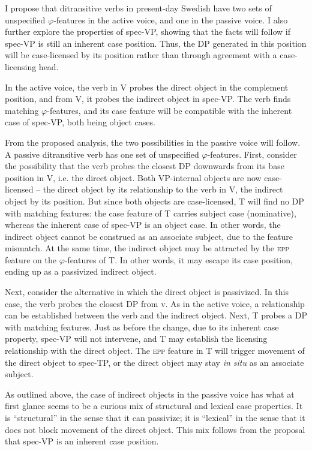 \documentclass[output=paper]{langscibook}
\begin{document}
I propose that ditransitive verbs in present-day Swedish have two sets of unspecified $\varphi $-features in the active voice, and one in the passive voice. I also further explore the properties of spec-VP, showing that the facts will follow if spec-VP is still an inherent case position. Thus, the DP generated in this position will be case-licensed by its position rather than through agreement with a case-licensing head.



In the active voice, the verb in V probes the direct object in the complement position, and from V, it probes the indirect object in spec-VP. The verb finds matching $\varphi $-features, and its case feature will be compatible with the inherent case of spec-VP, both being object cases.



From the proposed analysis, the two possibilities in the passive voice will follow. A passive ditransitive verb has one set of unspecified $\varphi $-features. First, consider the possibility that the verb probes the closest DP downwards from its base position in V, i.e. the direct object. Both VP-internal objects are now case-licensed – the direct object by its relationship to the verb in V, the indirect object by its position. But since both objects are case-licensed, T will find no DP with matching features: the case feature of T carries subject case (nominative), whereas the inherent case of spec-VP is an object case. In other words, the indirect object cannot be construed as an associate subject, due to the feature mismatch. At the same time, the indirect object may be attracted by the \textsc{epp} feature on the $\varphi $-features of T. In other words, it may escape its case position, ending up as a passivized indirect object.



Next, consider the alternative in which the direct object is passivized. In this case, the verb probes the closest DP from v. As in the active voice, a relationship can be established between the verb and the indirect object. Next, T probes a DP with matching features. Just as before the change, due to its inherent case property, spec-VP will not intervene, and T may establish the licensing relationship with the direct object. The \textsc{epp} feature in T will trigger movement of the direct object to spec-TP, or the direct object may stay \textit{in situ} as an associate subject.



As outlined above, the case of indirect objects in the passive voice has what at first glance seems to be a curious mix of structural and lexical case properties. It is “structural” in the sense that it can passivize; it is “lexical” in the sense that it does not block movement of the direct object. This mix follows from the proposal that spec-VP is an inherent case position.
\end{document}
